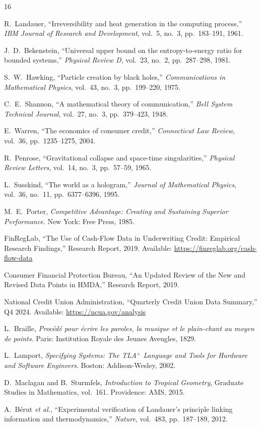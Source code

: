 \documentclass[11pt,twocolumn]{article}
\begin{document}
\begin{thebibliography}{16}

R.~Landauer, ``Irreversibility and heat generation in the computing process,''
\emph{IBM Journal of Research and Development}, vol.~5, no.~3, pp.~183--191, 1961.

J.~D.~Bekenstein, ``Universal upper bound on the entropy-to-energy ratio for bounded systems,''
\emph{Physical Review D}, vol.~23, no.~2, pp.~287--298, 1981.

S.~W.~Hawking, ``Particle creation by black holes,''
\emph{Communications in Mathematical Physics}, vol.~43, no.~3, pp.~199--220, 1975.

C.~E.~Shannon, ``A mathematical theory of communication,''
\emph{Bell System Technical Journal}, vol.~27, no.~3, pp.~379--423, 1948.

E.~Warren, ``The economics of consumer credit,''
\emph{Connecticut Law Review}, vol.~36, pp.~1235--1275, 2004.

R.~Penrose, ``Gravitational collapse and space-time singularities,''
\emph{Physical Review Letters}, vol.~14, no.~3, pp.~57--59, 1965.

L.~Susskind, ``The world as a hologram,''
\emph{Journal of Mathematical Physics}, vol.~36, no.~11, pp.~6377--6396, 1995.

M.~E.~Porter, \emph{Competitive Advantage: Creating and Sustaining Superior Performance}.
New York: Free Press, 1985.

FinRegLab, ``The Use of Cash-Flow Data in Underwriting Credit: Empirical Research Findings,''
Research Report, 2019. Available: \url{https://finreglab.org/cash-flow-data}

Consumer Financial Protection Bureau, ``An Updated Review of the New and Revised Data Points in HMDA,''
Research Report, 2019.

National Credit Union Administration, ``Quarterly Credit Union Data Summary,''
Q4 2024. Available: \url{https://ncua.gov/analysis}

L.~Braille, \emph{Proc\'{e}d\'{e} pour \'{e}crire les paroles, la musique et le plain-chant au moyen de points}.
Paris: Institution Royale des Jeunes Aveugles, 1829.

L.~Lamport, \emph{Specifying Systems: The TLA$^+$ Language and Tools for Hardware and Software Engineers}.
Boston: Addison-Wesley, 2002.

D.~Maclagan and B.~Sturmfels, \emph{Introduction to Tropical Geometry},
Graduate Studies in Mathematics, vol.~161. Providence: AMS, 2015.

A.~B\'{e}rut \emph{et al.}, ``Experimental verification of Landauer's principle linking information and thermodynamics,''
\emph{Nature}, vol.~483, pp.~187--189, 2012.

\end{thebibliography}
\end{document}
